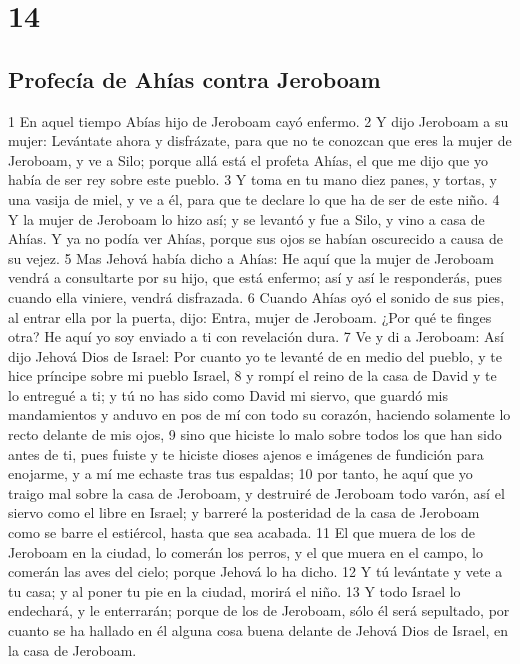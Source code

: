 \chapter{14}

\section*{Profecía de Ahías contra Jeroboam}


1 En aquel tiempo Abías hijo de Jeroboam cayó enfermo.
2 Y dijo Jeroboam a su mujer: Levántate ahora y disfrázate, para que no te conozcan que eres la mujer de Jeroboam, y ve a Silo; porque allá está el profeta Ahías, el que me dijo que yo había de ser rey sobre este pueblo.
3 Y toma en tu mano diez panes, y tortas, y una vasija de miel, y ve a él, para que te declare lo que ha de ser de este niño.
4 Y la mujer de Jeroboam lo hizo así; y se levantó y fue a Silo, y vino a casa de Ahías. Y ya no podía ver Ahías, porque sus ojos se habían oscurecido a causa de su vejez.
5 Mas Jehová había dicho a Ahías: He aquí que la mujer de Jeroboam vendrá a consultarte por su hijo, que está enfermo; así y así le responderás, pues cuando ella viniere, vendrá disfrazada.
6 Cuando Ahías oyó el sonido de sus pies, al entrar ella por la puerta, dijo: Entra, mujer de Jeroboam. ¿Por qué te finges otra? He aquí yo soy enviado a ti con revelación dura.
7 Ve y di a Jeroboam: Así dijo Jehová Dios de Israel: Por cuanto yo te levanté de en medio del pueblo, y te hice príncipe sobre mi pueblo Israel,
8 y rompí el reino de la casa de David y te lo entregué a ti; y tú no has sido como David mi siervo, que guardó mis mandamientos y anduvo en pos de mí con todo su corazón, haciendo solamente lo recto delante de mis ojos,
9 sino que hiciste lo malo sobre todos los que han sido antes de ti, pues fuiste y te hiciste dioses ajenos e imágenes de fundición para enojarme, y a mí me echaste tras tus espaldas;
10 por tanto, he aquí que yo traigo mal sobre la casa de Jeroboam, y destruiré de Jeroboam todo varón, así el siervo como el libre en Israel; y barreré la posteridad de la casa de Jeroboam como se barre el estiércol, hasta que sea acabada. 
11 El que muera de los de Jeroboam en la ciudad, lo comerán los perros, y el que muera en el campo, lo comerán las aves del cielo; porque Jehová lo ha dicho.
12 Y tú levántate y vete a tu casa; y al poner tu pie en la ciudad, morirá el niño.
13 Y todo Israel lo endechará, y le enterrarán; porque de los de Jeroboam, sólo él será sepultado, por cuanto se ha hallado en él alguna cosa buena delante de Jehová Dios de Israel, en la casa de Jeroboam.
